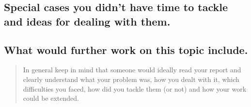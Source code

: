 \documentclass[11pt,a4paper,english]{article}
\begin{document}
    \subsection{Special cases you didn't have time to tackle and ideas for dealing with them.}
    \subsection{What would further work on this topic include.}
    
    \begin{quote}
	In general keep in mind that someone would ideally read your report and clearly understand what your problem was, how you dealt with it, which difficulties you faced, how did you tackle them (or not) and how your work could be extended.
    \end{quote}
    
\end{document}
